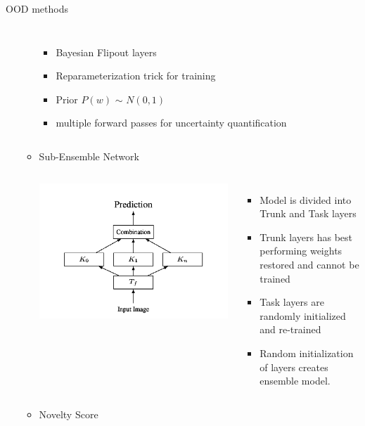 \documentclass[10pt, aspectratio=169]{beamer}
\begin{document}
\begin{frame}[allowframebreaks]{OOD methods}
\begin{itemize}
\begin{itemize}
\begin{columns}
\begin{itemize}
                        \item Bayesian Flipout layers \citep{Wen2018}
                        \item Reparameterization trick for training \citep{Kingma2015}
                        \item Prior $P(w)$ $\sim$ $N(0, 1)$
                        \item multiple forward passes for uncertainty quantification \newline \newline
                    \end{itemize}
            \end{columns} 
            \pagebreak
            \item Sub-Ensemble Network 
            \begin{columns}
                   \centering
                   \includegraphics[scale=0.25]{images/subensembles.png}
                    \begin{itemize}
                        \item Model is divided into Trunk and Task layers
                        \item Trunk layers has best performing weights restored and cannot be trained
                        \item Task layers are randomly initialized and re-trained
                        \item Random initialization of layers creates ensemble model. 
                    \end{itemize}
            \end{columns} \newpage
            \item Novelty Score \newline
            

\end{itemize}
\end{itemize}
\end{frame}
\end{document}
